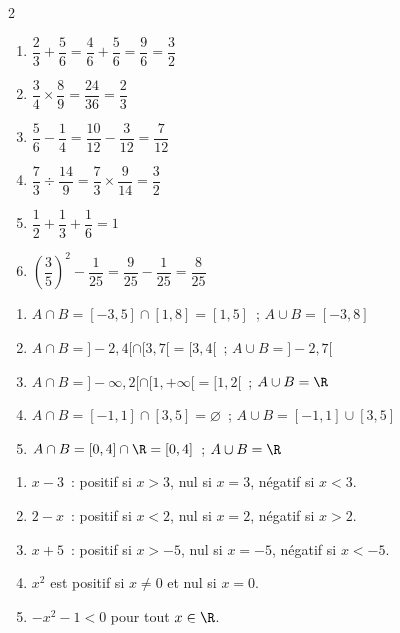 \begin{multicols}{2}
\begin{enumerate}
  \item $\dfrac{2}{3}+\dfrac{5}{6}=\dfrac{4}{6}+\dfrac{5}{6}=\dfrac{9}{6}=\dfrac{3}{2}$
  \item $\dfrac{3}{4}\times\dfrac{8}{9}=\dfrac{24}{36}=\dfrac{2}{3}$
  \item $\dfrac{5}{6}-\dfrac{1}{4}=\dfrac{10}{12}-\dfrac{3}{12}=\dfrac{7}{12}$
  \item $\dfrac{7}{3}\div\dfrac{14}{9}=\dfrac{7}{3}\times\dfrac{9}{14}=\dfrac{3}{2}$
  \item $\dfrac{1}{2}+\dfrac{1}{3}+\dfrac{1}{6}=1$
  \item $\left(\dfrac{3}{5}\right)^2-\dfrac{1}{25}=\dfrac{9}{25}-\dfrac{1}{25}=\dfrac{8}{25}$
\end{enumerate}
\end{multicols}


\begin{enumerate}
  \item $A\cap B=[-3,5]\cap[1,8]=[1,5]$~; $A\cup B=[-3,8]$
  \item $A\cap B=]-2,4[\cap[3,7[=[3,4[$~; $A\cup B=]-2,7[$
  \item $A\cap B=]-\infty,2[\cap[1,+\infty[=[1,2[$~; $A\cup B=\R$
  \item $A\cap B=[-1,1]\cap[3,5]=\varnothing$~; $A\cup B=[-1,1]\cup[3,5]$
  \item $A\cap B=[0,4]\cap\R=[0,4]$~; $A\cup B=\R$
\end{enumerate}


\begin{enumerate}
  \item $x-3$~: positif si $x>3$, nul si $x=3$, n\'egatif si $x<3$.
  \item $2-x$~: positif si $x<2$, nul si $x=2$, n\'egatif si $x>2$.
  \item $x+5$~: positif si $x>-5$, nul si $x=-5$, n\'egatif si $x<-5$.
  \item $x^2$ est positif si $x\ne0$ et nul si $x=0$.
  \item $-x^2-1<0$ pour tout $x\in\R$.
\end{enumerate}

